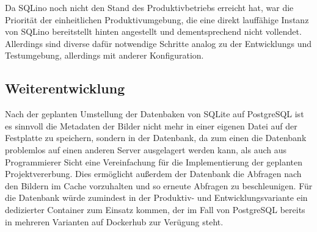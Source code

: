 Da SQLino noch nicht den Stand des Produktivbetriebs erreicht hat, war die
Priorität der einheitlichen Produktivumgebung, die eine direkt lauffähige
Instanz von SQLino bereitstellt hinten angestellt und dementsprechend nicht
vollendet. Allerdings sind diverse dafür notwendige Schritte analog zu der
Entwicklungs und Testumgebung, allerdings mit anderer Konfiguration.

\subsection{Weiterentwicklung}

Nach der geplanten Umstellung der Datenbaken von SQLite auf PostgreSQL ist es
sinnvoll die Metadaten der Bilder nicht mehr in einer eigenen Datei auf der
Festplatte zu speichern, sondern in der Datenbank, da zum einen die Datenbank
problemlos auf einen anderen Server ausgelagert werden kann, als auch aus
Programmierer Sicht eine Vereinfachung für die Implementierung der geplanten
Projektvererbung. Dies ermöglicht außerdem der Datenbank die Abfragen nach den
Bildern im Cache vorzuhalten und so erneute Abfragen zu beschleunigen. Für die
Datenbank würde zumindest in der Produktiv- und Entwicklungsvariante ein
dedizierter Container zum Einsatz kommen, der im Fall von PostgreSQL bereits in
mehreren Varianten auf Dockerhub zur Verügung steht.

